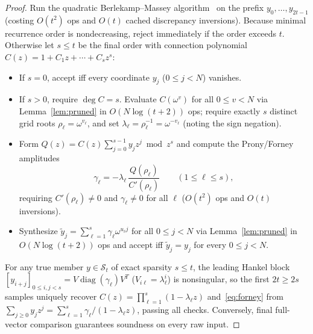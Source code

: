 \documentclass[11pt,reqno]{amsart}
\numberwithin{equation}{section}
\theoremstyle{definition}
\theoremstyle{remark}
\newcommand{\diag}{\operatorname{diag}}
\begin{document}
\begin{proof}
Run the quadratic Berlekamp--Massey algorithm~\cite{Mas69} on the prefix $y_0,\ldots,y_{2t-1}$ (costing $O(t^2)$ ops and $O(t)$ cached discrepancy inversions). Because minimal recurrence order is nondecreasing, reject immediately if the order exceeds $t$. Otherwise let $s\le t$ be the final order with connection polynomial $C(z) = 1 + C_1 z + \cdots + C_s z^s$:
\begin{itemize}[leftmargin=1.5em]
\item If $s = 0$, accept iff every coordinate $y_j$ ($0\le j<N$) vanishes.
\item If $s > 0$, require $\deg C = s$. Evaluate $C(\omega^v)$ for all $0\le v<N$ via Lemma~\ref{lem:pruned} in $O(N\log(t+2))$ ops; require exactly $s$ distinct grid roots $\rho_\ell = \omega^{v_\ell}$, and set $\lambda_\ell = \rho_\ell^{-1} = \omega^{-v_\ell}$ (noting the sign negation).
\item Form $Q(z) = C(z)\sum_{j=0}^{s-1} y_j z^j \bmod z^s$ and compute the Prony/Forney amplitudes~\cite{PP13}
\begin{equation}
\label{eq:forney}
\gamma_\ell = -\lambda_\ell\,\frac{Q(\rho_\ell)}{C'(\rho_\ell)}\qquad (1\le \ell\le s),
\end{equation}
requiring $C'(\rho_\ell)\neq 0$ and $\gamma_\ell\neq 0$ for all $\ell$ ($O(t^2)$ ops and $O(t)$ inversions).
\item Synthesize $\tilde{y}_j = \sum_{\ell=1}^s \gamma_\ell \omega^{u_\ell j}$ for all $0\le j<N$ via Lemma~\ref{lem:pruned} in $O(N\log(t+2))$ ops and accept iff $\tilde{y}_j = y_j$ for every $0\le j<N$.
\end{itemize}
For any true member $y\in\mathcal{S}_t$ of exact sparsity $s\le t$, the leading Hankel block $[y_{i+j}]_{0\le i,j<s} = V\diag(\gamma_\ell)V^T$ ($V_{i\ell}=\lambda_\ell^i$) is nonsingular, so the first $2t\ge 2s$ samples uniquely recover $C(z)=\prod_{\ell=1}^s(1-\lambda_\ell z)$ and~\eqref{eq:forney} from $\sum_{j\ge 0} y_j z^j = \sum_{\ell=1}^s \gamma_\ell/(1-\lambda_\ell z)$, passing all checks. Conversely, final full-vector comparison guarantees soundness on every raw input.
\end{proof}
\end{document}
